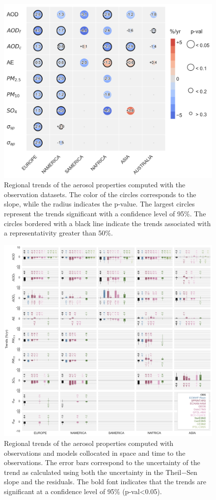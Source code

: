\documentclass[acp, manuscript]{copernicus}
\begin{document}
\clearpage
\begin{figure}[t]
 \includegraphics[width=12cm]{Figures/Figure5.png}
 \caption{Regional trends of the aerosol properties computed with the observation datasets. The color of the circles corresponds to the slope, while the radius indicates the p-value. The largest circles represent the trends significant with a confidence level of 95\%. The circles bordered with a black line indicate the trends associated with a representativity greater than 50\%.}
 \label{fig:obs_trends}
\end{figure}

\clearpage
\begin{figure}[t]
 \includegraphics[width=16cm]{Figures/Figure6.png}
 \caption{Regional trends of the aerosol properties computed with observations and models collocated in space and time to the observations. The error bars correspond to the uncertainty of the trend as calculated using both the uncertainty in the Theil−Sen slope and the residuals. The bold font indicates that the trends are significant at a confidence level of 95\% (p-val<0.05).}
 \label{fig:bars}
\end{figure}
\end{document}
